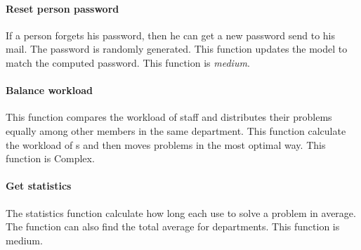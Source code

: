 \paragraph{Reset person password}
If a person forgets his password, then he can get a new password send to his mail. The password is randomly generated. This function updates the model to match the computed password. This function is \textit{medium}.

\paragraph{Balance workload}
This function compares the workload of staff and distributes their problems equally among other \astaff members in the same department. This function calculate the workload of \astaff s and then moves problems in the most optimal way. This function is Complex.   

\paragraph{Get statistics}
The statistics function calculate how long each \astaff[] use to solve a problem in average. The function can also find the total average for departments. This function is medium.










